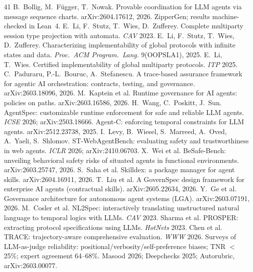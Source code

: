 \documentclass{article}
\begin{document}
\begin{thebibliography}{41}
 B.~Bollig, M.~F\"ugger, T.~Nowak. Provable coordination for LLM agents via message sequence charts. arXiv:2604.17612, 2026. ZipperGen; results machine-checked in Lean~4.
 E.~Li, F.~Stutz, T.~Wies, D.~Zufferey. Complete multiparty session type projection with automata. \emph{CAV} 2023.
 E.~Li, F.~Stutz, T.~Wies, D.~Zufferey. Characterizing implementability of global protocols with infinite states and data. \emph{Proc.\ ACM Program.\ Lang.} 9(OOPSLA1), 2025.
 E.~Li, T.~Wies. Certified implementability of global multiparty protocols. \emph{ITP} 2025.
 C.~Paduraru, P.-L.~Bouruc, A.~Stefanescu. A trace-based assurance framework for agentic AI orchestration: contracts, testing, and governance. arXiv:2603.18096, 2026.
 M.~Kaptein et al. Runtime governance for AI agents: policies on paths. arXiv:2603.16586, 2026.
 H.~Wang, C.~Poskitt, J.~Sun. AgentSpec: customizable runtime enforcement for safe and reliable LLM agents. \emph{ICSE} 2026; arXiv:2503.18666.
 Agent-C: enforcing temporal constraints for LLM agents. arXiv:2512.23738, 2025.
 I.~Levy, B.~Wiesel, S.~Marreed, A.~Oved, A.~Yaeli, S.~Shlomov. ST-WebAgentBench: evaluating safety and trustworthiness in web agents. \emph{ICLR} 2026; arXiv:2410.06703.
 X.~Wei et al. BeSafe-Bench: unveiling behavioral safety risks of situated agents in functional environments. arXiv:2603.25747, 2026.
 S.~Saha et al. Skilldex: a package manager for agent skills. arXiv:2604.16911, 2026.
 T.~Liu et al. A GovernSpec design framework for enterprise AI agents (contractual skills). arXiv:2605.22634, 2026.
 Y.~Ge et al. Governance architecture for autonomous agent systems (LGA). arXiv:2603.07191, 2026.
 M.~Cosler et al. NL2Spec: interactively translating unstructured natural language to temporal logics with LLMs. \emph{CAV} 2023.
 Sharma et al. PROSPER: extracting protocol specifications using LLMs. \emph{HotNets} 2023.
 Chen et al. TRACE: trajectory-aware comprehensive evaluation. \emph{WWW} 2026.
 Surveys of LLM-as-judge reliability: positional/verbosity/self-preference biases; TNR $<$25\%; expert agreement 64--68\%. Masood 2026; Deepchecks 2025; Autorubric, arXiv:2603.00077.

\end{thebibliography}
\end{document}

